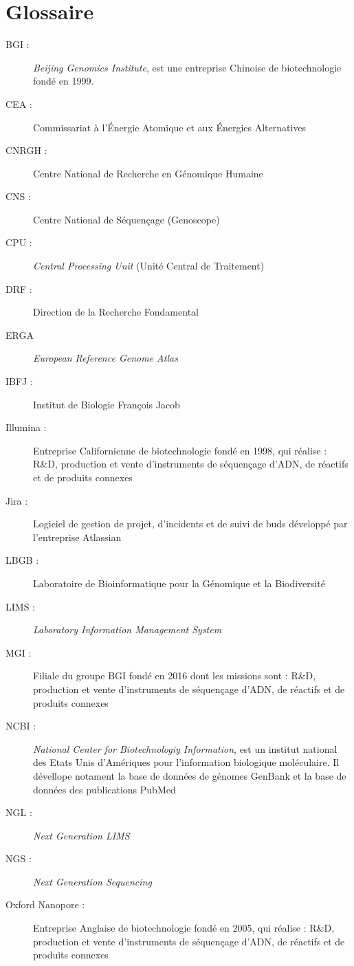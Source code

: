 \section*{Glossaire}

\begin{description}
    \item[BGI : ] \emph{Beijing Genomics Institute}, est une entreprise Chinoise de biotechnologie fondé en 1999.
    \item[CEA :] Commissariat à l'Énergie Atomique et aux Énergies Alternatives
    \item[CNRGH :] Centre National de Recherche en Génomique Humaine 
    \item[CNS :] Centre National de Séquençage (Genoscope)
    \item[CPU :] \emph{Central Processing Unit} (Unité Central de Traitement)
    \item[DRF :] Direction de la Recherche Fondamental
    \item[ERGA] \emph{European Reference Genome Atlas}
    \item[IBFJ :] Institut de Biologie François Jacob
    \item[Illumina :] Entreprise Californienne de biotechnologie fondé en 1998, qui réalise : R\&D, production et vente d’instruments de séquençage d’ADN, de réactifs et de produits connexes
    \item[Jira :] Logiciel de gestion de projet, d'incidents et de suivi de buds développé par l'entreprise Atlassian
    \item[LBGB :] Laboratoire de Bioinformatique pour la Génomique et la Biodiversité
    \item[LIMS :] \emph{Laboratory Information Management System}
    \item[MGI : ] Filiale du groupe BGI fondé en 2016 dont les missions sont : R\&D, production et vente d’instruments de séquençage 
    d’ADN, de réactifs et de produits connexes
    \item[NCBI :] \emph{National Center for Biotechnologiy Information}, est un institut national des Etats Unis d'Amériques pour l'information biologique moléculaire. Il dévellope notament la base de données de génomes GenBank et la base de données des publications PubMed
    \item[NGL :] \emph{Next Generation LIMS}
    \item[NGS :] \emph{Next Generation Sequencing}
    \item[Oxford Nanopore :] Entreprise Anglaise de biotechnologie fondé en 2005, qui réalise : R\&D, production et vente d’instruments de séquençage d’ADN, de réactifs et de produits connexes

\end{description}
